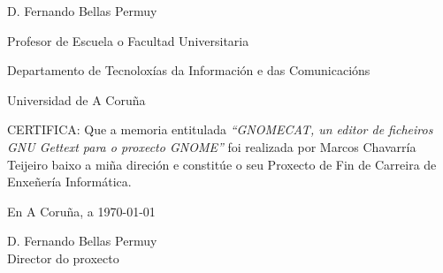 %
%

\begin{center}
	\begin{minipage}[t][6cm][l]{.8\textwidth}
		\begin{center}
			D. {\sc Fernando Bellas Permuy}

			Profesor de Escuela o Facultad Universitaria

			Departamento de Tecnoloxías da Información e das Comunicacións

			Universidad de A Coruña
		\end{center}
	\end{minipage}
\end{center}

CERTIFICA:
Que a memoria entitulada {\it ``GNOMECAT, un editor de ficheiros GNU Gettext para o proxecto GNOME''} foi realizada por {\sc Marcos Chavarría Teijeiro} baixo a miña direción e constitúe o seu Proxecto de Fin de Carreira de Enxeñería Informática.

\vspace{5cm}

En A Coruña, a \today

\vspace{3cm}

\begin{center}
	\begin{minipage}[t][4cm][l]{.5\textwidth}
	D. {\sc Fernando Bellas Permuy}
	\\
	Director do proxecto
	\end{minipage}
\end{center}
